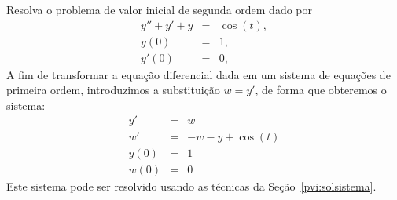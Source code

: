 \begin{ex} Resolva o problema de valor inicial de segunda ordem dado por
\begin{eqnarray*}
y''+y'+y&=&\cos(t),\\
y(0)&=&1,\\
y'(0)&=&0,
\end{eqnarray*}
A fim de transformar a equação diferencial dada em um sistema de equações de primeira ordem, introduzimos a substituição $w=y'$, de forma que obteremos o sistema:
\begin{eqnarray*}
y'&=&w\\
w'&=&-w-y+\cos(t)\\
y(0)&=&1\\
w(0)&=&0
\end{eqnarray*}
Este sistema pode ser resolvido usando as técnicas da Seção~\ref{pvi:solsistema}.
\end{ex}


